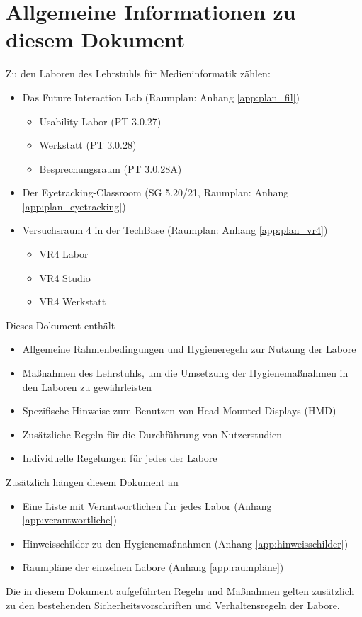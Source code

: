 \section{Allgemeine Informationen zu diesem Dokument}\label{sec:infos}

{
\singlespacing

Zu den Laboren des Lehrstuhls für Medieninformatik zählen:

\begin{itemize}
    \item Das Future Interaction Lab (Raumplan: Anhang \ref{app:plan_fil})
    \begin{itemize}
        \item Usability-Labor (PT 3.0.27)
        \item Werkstatt (PT 3.0.28)
        \item Besprechungsraum (PT 3.0.28A)
    \end{itemize}
    \item Der Eyetracking-Classroom (SG 5.20/21, Raumplan: Anhang \ref{app:plan_eyetracking})
    \item Versuchsraum 4 in der TechBase (Raumplan: Anhang \ref{app:plan_vr4})
    \begin{itemize}
        \item VR4 Labor
        \item VR4 Studio
        \item VR4 Werkstatt
    \end{itemize}
\end{itemize}

\bigskip
\noindent
Dieses Dokument enthält

\begin{itemize}
    \item Allgemeine Rahmenbedingungen und Hygieneregeln zur Nutzung der Labore
    \item Maßnahmen des Lehrstuhls, um die Umsetzung der Hygienemaßnahmen in den Laboren zu gewährleisten
    \item Spezifische Hinweise zum Benutzen von Head-Mounted Displays (HMD)
    \item Zusätzliche Regeln für die Durchführung von Nutzerstudien
    \item Individuelle Regelungen für jedes der Labore
\end{itemize}

\bigskip
\noindent
Zusätzlich hängen diesem Dokument an

\begin{itemize}
    \item Eine Liste mit Verantwortlichen für jedes Labor (Anhang \ref{app:verantwortliche})
    \item Hinweisschilder zu den Hygienemaßnahmen (Anhang \ref{app:hinweisschilder})
    \item Raumpläne der einzelnen Labore (Anhang \ref{app:raumpläne})
\end{itemize}

\bigskip
\noindent
Die in diesem Dokument aufgeführten Regeln und Maßnahmen gelten zusätzlich zu den bestehenden Sicherheitsvorschriften und Verhaltensregeln der Labore.
}
